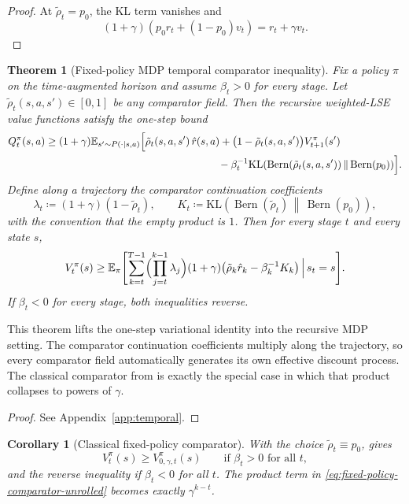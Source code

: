 \documentclass{article}
\newtheorem{theorem}{Theorem}[section]
\newtheorem{corollary}[corollary]{Corollary}
\theoremstyle{remark}
\DeclareMathOperator{\Bern}{Bern}
\newcommand{\E}{\mathbb{E}}
\newcommand{\KL}{\mathrm{KL}}
\newcommand{\defeq}{\coloneqq}
\newcommand{\pprior}{p_0}
\newcommand{\KLbin}[2]{\KL\!\left(\Bern(#1)\,\middle\|\,\Bern(#2)\right)}
\begin{document}
\begin{proof}
At $\tilde\rho_t=\pprior$, the KL term vanishes and
\[(1+\gamma)(\pprior r_t + (1-\pprior)v_t)=r_t+\gamma v_t.\]
\end{proof}

\begin{theorem}[Fixed-policy MDP temporal comparator inequality]
\label{thm:fixed-policy-comparator}
Fix a policy $\pi$ on the time-augmented horizon and assume $\beta_t>0$ for every stage.
Let $\tilde\rho_t(s,a,s')\in[0,1]$ be any comparator field.
Then the recursive weighted-LSE value functions satisfy the one-step bound
\begin{align}
Q_t^\pi(s,a)
\ge
(1+\gamma)
\E_{s'\sim P(\cdot\mid s,a)}
\Bigl[
&\tilde\rho_t(s,a,s')\,\hat r(s,a)
+\bigl(1-\tilde\rho_t(s,a,s')\bigr)V_{t+1}^\pi(s')
\nonumber\\
&\hspace{7em}-\beta_t^{-1}\KLbin{\tilde\rho_t(s,a,s')}{\pprior}
\Bigr].
\label{eq:fixed-policy-comparator-one-step}
\end{align}
Define along a trajectory the comparator continuation coefficients
\[
\lambda_t \defeq (1+\gamma)(1-\tilde\rho_t),
\qquad
K_t \defeq \KLbin{\tilde\rho_t}{\pprior},
\]
with the convention that the empty product is $1$.
Then for every stage $t$ and every state $s$,
\begin{equation}
V_t^\pi(s)
\ge
\E_\pi\Biggl[
\sum_{k=t}^{T-1}
\Bigl(\prod_{j=t}^{k-1}\lambda_j\Bigr)
(1+\gamma)\bigl(\tilde\rho_k\hat r_k - \beta_k^{-1}K_k\bigr)
\,\Big|\, s_t=s
\Biggr].
\label{eq:fixed-policy-comparator-unrolled}
\end{equation}
If $\beta_t<0$ for every stage, both inequalities reverse.
\end{theorem}

This theorem lifts the one-step variational identity into the recursive MDP setting.
The comparator continuation coefficients multiply along the trajectory, so every comparator field automatically generates its own effective discount process.
The classical comparator from  is exactly the special case in which that product collapses to powers of $\gamma$.

\begin{proof}
See Appendix~\ref{app:temporal}.
\end{proof}

\begin{corollary}[Classical fixed-policy comparator]
\label{cor:fixed-policy-classical}
With the choice $\tilde\rho_t\equiv \pprior$,  gives
\[
V_t^\pi(s) \ge V_{0,\gamma,t}^\pi(s)
\qquad\text{if } \beta_t>0 \text{ for all } t,
\]
and the reverse inequality if $\beta_t<0$ for all $t$.
The product term in \eqref{eq:fixed-policy-comparator-unrolled} becomes exactly $\gamma^{k-t}$.
\end{corollary}
\end{document}
